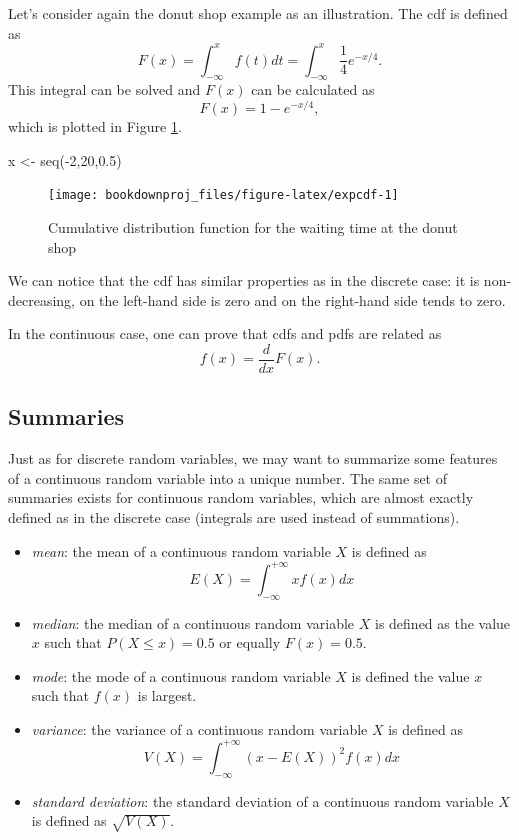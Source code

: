\documentclass[
]{book}
\newenvironment{Shaded}{\begin{snugshade}}{\end{snugshade}}
\newcommand{\DecValTok}[1]{\textcolor[rgb]{0.00,0.00,0.81}{#1}}
\newcommand{\FloatTok}[1]{\textcolor[rgb]{0.00,0.00,0.81}{#1}}
\newcommand{\FunctionTok}[1]{\textcolor[rgb]{0.00,0.00,0.00}{#1}}
\newcommand{\NormalTok}[1]{#1}
\newcommand{\OtherTok}[1]{\textcolor[rgb]{0.56,0.35,0.01}{#1}}
\newcommand{\SpecialCharTok}[1]{\textcolor[rgb]{0.00,0.00,0.00}{#1}}
\theoremstyle{definition}
\theoremstyle{definition}
\theoremstyle{definition}
\theoremstyle{definition}
\theoremstyle{remark}
\begin{document}
Let's consider again the donut shop example as an illustration. The cdf is defined as
\[
F(x)=\int_{-\infty}^xf(t)dt = \int_{-\infty}^x\frac{1}{4}e^{-x/4}.
\]
This integral can be solved and \(F(x)\) can be calculated as
\[
F(x)= 1- e^{-x/4},
\]
which is plotted in Figure \ref{fig:expcdf}.

\begin{Shaded}
\begin{Highlighting}[]
\NormalTok{x }\OtherTok{\textless{}{-}} \FunctionTok{seq}\NormalTok{(}\SpecialCharTok{{-}}\DecValTok{2}\NormalTok{,}\DecValTok{20}\NormalTok{,}\FloatTok{0.5}\NormalTok{)}
\end{Highlighting}
\end{Shaded}

\begin{figure}

{\centering \texttt{[image: bookdownproj\_files/figure-latex/expcdf-1]} 

}

\caption{Cumulative distribution function for the waiting time at the donut shop}\label{fig:expcdf}
\end{figure}

We can notice that the cdf has similar properties as in the discrete case: it is non-decreasing, on the left-hand side is zero and on the right-hand side tends to zero.

In the continuous case, one can prove that cdfs and pdfs are related as
\[
f(x)=\frac{d}{dx}F(x).
\]

\hypertarget{summaries-1}{%
\subsection{Summaries}\label{summaries-1}}

Just as for discrete random variables, we may want to summarize some features of a continuous random variable into a unique number. The same set of summaries exists for continuous random variables, which are almost exactly defined as in the discrete case (integrals are used instead of summations).

\begin{itemize}
\item
  \emph{mean}: the mean of a continuous random variable \(X\) is defined as
  \[
   E(X) = \int_{-\infty}^{+\infty}xf(x)dx
   \]
\item
  \emph{median}: the median of a continuous random variable \(X\) is defined as the value \(x\) such that \(P(X\leq x) = 0.5\) or equally \(F(x)=0.5\).
\item
  \emph{mode}: the mode of a continuous random variable \(X\) is defined the value \(x\) such that \(f(x)\) is largest.
\item
  \emph{variance}: the variance of a continuous random variable \(X\) is defined as
  \[
   V(X)=\int_{-\infty}^{+\infty}(x-E(X))^2f(x)dx
   \]
\item
  \emph{standard deviation}: the standard deviation of a continuous random variable \(X\) is defined as \(\sqrt{V(X)}\).
\end{itemize}
\end{document}
